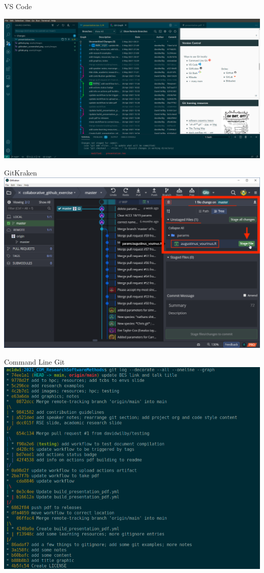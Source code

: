 \documentclass{beamer} %
\begin{document}
  \begin{frame}{VS Code}
    \begin{center}
      \includegraphics[width=1.1\textwidth]{vscode_screenshot.png}
    \end{center}
  \end{frame}

  \begin{frame}{GitKraken}
    \includegraphics[width=\textwidth]{gitkraken_screenshot.png}
  \end{frame}

  \begin{frame}{Command Line Git}
    \includegraphics[width=\textwidth]{git_cmd_line_screenshot.png}
  \end{frame}
\end{document}
